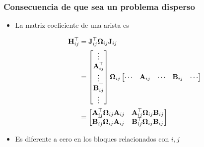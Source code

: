 \begin{frame}
	\frametitle{Consecuencia de que sea un problema disperso}
	
	\begin{itemize}
		\item La matriz coeficiente de una arista es

		\begin{align*}
			\boldsymbol{\mathbf{H}}_{ij}^{\top} &= \boldsymbol{\mathbf{J}}_{ij}^{\top}\boldsymbol{\mathbf{\Omega}}_{ij}\boldsymbol{\mathbf{J}}_{ij}\\
			&= 
			\begin{bmatrix}
				\vdots \\
				\boldsymbol{\mathbf{A}}_{ij}^{\top}\\
				\vdots \\
				\boldsymbol{\mathbf{B}}_{ij}^{\top}\\
				\vdots
			\end{bmatrix} \boldsymbol{\mathbf{\Omega}}_{ij}
			\begin{bmatrix}
				\cdots & \boldsymbol{\mathbf{A}}_{ij} & \cdots & \boldsymbol{\mathbf{B}}_{ij} & \cdots
			\end{bmatrix}\\
			&= 
			\begin{bmatrix}
				\boldsymbol{\mathbf{A}}_{ij}^{\top}\boldsymbol{\mathbf{\Omega}}_{ij}\boldsymbol{\mathbf{A}}_{ij} & \boldsymbol{\mathbf{A}}_{ij}^{\top}\boldsymbol{\mathbf{\Omega}}_{ij}\boldsymbol{\mathbf{B}}_{ij}\\
				\boldsymbol{\mathbf{B}}_{ij}^{\top}\boldsymbol{\mathbf{\Omega}}_{ij}\boldsymbol{\mathbf{A}}_{ij} & \boldsymbol{\mathbf{B}}_{ij}^{\top}\boldsymbol{\mathbf{\Omega}}_{ij}\boldsymbol{\mathbf{B}}_{ij}
			\end{bmatrix}
		\end{align*}
		\item Es diferente a cero en los bloques relacionados con $i,j$
	\end{itemize}
	
\end{frame}


